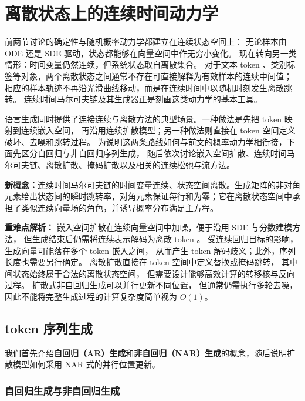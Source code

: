 \documentclass[UTF8,a4paper,zihao=-4,oneside,openany]{ctexbook}
\begin{document}
\section{离散状态上的连续时间动力学}
\label{sec:diffusion-models-in-language}

前两节讨论的确定性与随机概率动力学都建立在连续状态空间上：
无论样本由 ODE 还是 SDE 驱动，状态都能够在向量空间中作无穷小变化。
现在转向另一类情形：时间变量仍然连续，但系统状态取自离散集合。
对于文本 token 、类别标签等对象，两个离散状态之间通常不存在可直接解释为有效样本的连续中间值；
相应的样本轨迹不再沿光滑曲线移动，而是在连续时间中以随机时刻发生离散跳转。
连续时间马尔可夫链及其生成器正是刻画这类动力学的基本工具。

语言生成同时提供了连接连续与离散方法的典型场景。一种做法是先把 token 映射到连续嵌入空间，
再沿用连续扩散模型；另一种做法则直接在 token 空间定义破坏、去噪和跳转过程。
为说明这两条路线如何与前文的概率动力学相衔接，下面先区分自回归与非自回归序列生成，
随后依次讨论嵌入空间扩散、连续时间马尔可夫链、离散扩散、掩码扩散以及相关的连续松弛与流方法。

\begin{importantnote}
\textbf{新概念：}连续时间马尔可夫链的时间变量连续、状态空间离散。生成矩阵的非对角元素给出状态间的瞬时跳转率，对角元素保证每行和为零；它在离散状态空间中承担了类似连续向量场的角色，并诱导概率分布满足主方程。

\textbf{重难点解析：}
嵌入空间扩散在连续向量空间中加噪，便于沿用 SDE 与分数建模方法，
但生成结束后仍需将连续表示解码为离散 token 。
受连续回归目标的影响，生成向量可能落在多个 token 嵌入之间，
从而产生 token 解码歧义；此外，序列长度也需要另行确定。
离散扩散直接在 token 空间中定义替换或掩码跳转，
其中间状态始终属于合法的离散状态空间，
但需要设计能够高效计算的转移核与反向过程。
扩散式非自回归生成可以并行更新不同位置，
但通常仍需执行多轮去噪，因此不能将完整生成过程的计算复杂度简单视为 \(O(1)\)。
\end{importantnote}

\subsection{ token 序列生成}

我们首先介绍\textbf{自回归（AR）生成}和\textbf{非自回归（NAR）生成}的概念，随后说明扩散模型如何采用 NAR 式的并行位置更新。
\subsubsection{自回归生成与非自回归生成}
\end{document}
